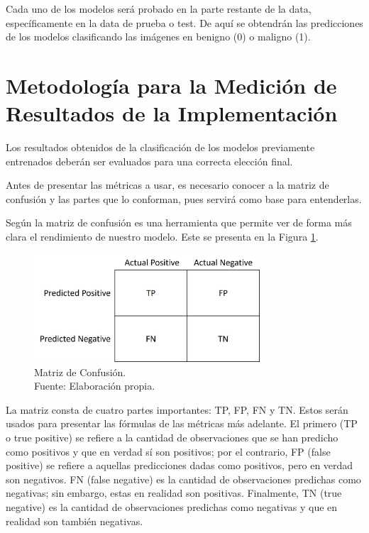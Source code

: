 Cada uno de los modelos será probado en la parte restante de la data, específicamente en la data de prueba o test. De aquí se obtendrán las predicciones de los modelos clasificando las imágenes en benigno (0) o maligno (1).

\section{Metodología para la Medición de Resultados de la Implementación}

Los resultados obtenidos de la clasificación de los modelos previamente entrenados deberán ser evaluados para una correcta elección final. 

Antes de presentar las métricas a usar, es necesario conocer a la matriz de confusión y las partes que lo conforman, pues servirá como base para entenderlas. 

Según \cite{ws_izco2018bdcp} la matriz de confusión es una herramienta que permite ver de forma más clara el rendimiento de nuestro modelo. Este se presenta en la Figura \ref{3:fig302}.

\begin{figure}[H]
	\begin{center}
		\includegraphics[width=0.75\textwidth]{3/figures/conf_matrix.jpg}
		\caption[Matriz de Confusión]{Matriz de Confusión. \\
		Fuente: Elaboración propia.}
		\label{3:fig302}
	\end{center}
\end{figure}

La matriz consta de cuatro partes importantes: TP, FP, FN y TN. Estos serán usados para presentar las fórmulas de las métricas más adelante. El primero (TP o true positive) se refiere a la cantidad de observaciones que se han predicho como positivos y que en verdad sí son positivos; por el contrario, FP (false positive) se refiere a aquellas predicciones dadas como positivos, pero en verdad son negativos. FN (false negative) es la cantidad de observaciones predichas como negativas; sin embargo, estas en realidad son positivas. Finalmente, TN (true negative) es la cantidad de observaciones predichas como negativas y que en realidad son también negativas.

